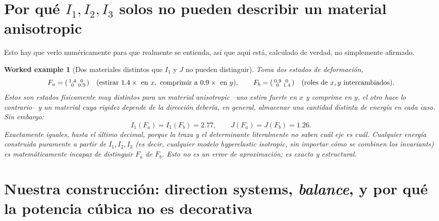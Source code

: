 \documentclass[11pt,a4paper]{article}
\newtheorem{worked}{Worked example}
\begin{document}
\section{Por qu\'e $I_1,I_2,I_3$ solos no pueden describir un material anisotropic}
\label{sec:isotropy-blindness}

Esto hay que verlo num\'ericamente para que realmente se entienda, as\'i
que aqu\'i est\'a, calculado de verdad, no simplemente afirmado.

\begin{worked}[Dos materiales distintos que $I_1$ y $J$ no pueden distinguir]
\label{ex:isotropy-blind}
Toma dos estados de deformaci\'on,
\[
 F_a=\begin{psmallmatrix}1.4&0\\0&0.9\end{psmallmatrix}
 \quad(\text{estirar }1.4\times\text{ en }x,\ \text{comprimir a }0.9\times\text{ en }y),
 \qquad
 F_b=\begin{psmallmatrix}0.9&0\\0&1.4\end{psmallmatrix}
 \quad(\text{roles de }x,y\text{ intercambiados}).
\]
Estos son estados f\'isicamente muy distintos para un material
anisotropic --uno estira fuerte en $x$ y comprime en $y$, el otro hace
lo contrario-- y un material cuya rigidez depende de la direcci\'on
deber\'ia, en general, almacenar una cantidad distinta de energ\'ia en
cada caso. Sin embargo:
\[
 I_1(F_a)=I_1(F_b)=2.77, \qquad J(F_a)=J(F_b)=1.26 .
\]
Exactamente iguales, hasta el \'ultimo decimal, porque la traza y el
determinante literalmente no saben cu\'al eje es cu\'al. \emph{Cualquier}
energ\'ia construida puramente a partir de $I_1,I_2,I_3$ (es decir,
cualquier modelo hyperelastic \emph{isotropic}, sin importar c\'omo se
combinen los \emph{invariants}) es matem\'aticamente incapaz de
distinguir $F_a$ de $F_b$. Esto no es un error de aproximaci\'on; es
exacto y estructural.
\end{worked}

\section{Nuestra construcci\'on: direction systems, \emph{balance}, y por qu\'e la potencia c\'ubica no es decorativa}
\label{sec:our-construction}
\end{document}

